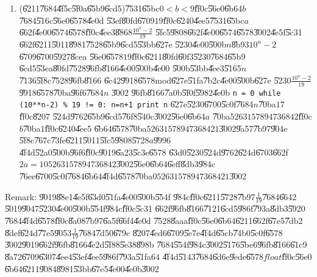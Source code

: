 \documentclass{article}
\begin{document}
\begin{enumerate}
\item (\U{6211}\U{7684}\U{4f5c}\U{5f0a}\U{65b9}\U{6cd5})\U{7531}\U{65bc}$%
0<b<9$\U{ff0c}\U{56e0}\U{6b64}$b$\U{7684}\U{516c}\U{56e0}\U{6578}\U{4e0d}%
\U{53ef}\U{80fd}\U{6709}$19$\U{ff0c}\U{6240}\U{4ee5}\U{7531}\U{65bc}$a$%
\U{662f}\U{4e00}\U{6574}\U{6578}\U{ff0c}\U{4ee3}\U{8868}$\frac{10^{n}-2}{19}$%
\U{5fc5}\U{9808}\U{662f}\U{4e00}\U{6574}\U{6578}\U{3002}\U{4e5f}\U{5c31}%
\U{662f}\U{6211}\U{5011}\U{8981}\U{7528}\U{65b9}\U{6cd5}\U{53bb}\U{627e}%
\U{5230}\U{4e00}\U{500b}$n$\U{8b93}$10^{n}-2$\U{6709}\U{6700}\U{5927}\U{8cea}%
\U{56e0}\U{6578}$19$\U{ff0c}\U{6211}\U{80fd}\U{60f3}\U{5230}\U{7684}\U{65b9}%
\U{6cd5}\U{53ea}\U{80fd}\U{7528}\U{96fb}\U{8166}\U{4e00}\U{500b}\U{4e00}%
\U{500b}\U{53bb}\U{4ee3}\U{5165}$n$\U{7136}\U{5f8c}\U{7528}\U{96fb}\U{8166}%
\U{6c42}\U{9918}\U{6578}mod\U{627e}\U{51fa}\U{7b2c}\U{4e00}\U{500b}\U{627e}%
\U{5230}$\frac{10^{n}-2}{19}$\U{9918}\U{6578}\U{70ba}\U{96f6}\U{7684}$n$%
\U{3002}\newline
\U{96fb}\U{8166}\U{7a0b}\U{5f0f}\U{5982}\U{4e0b}\newline
\texttt{n = 0\newline
while (10**n-2) \% 19 != 0:\newline
\quad n=n+1\newline
print n}\newline
\U{627e}\U{5230}\U{6700}\U{5c0f}\U{7684}$n$\U{70ba}$17$\U{ff0c}\U{8207}%
\U{524d}\U{9762}\U{65b9}\U{6cd5}\U{76f8}\U{540c}\U{3002}\U{56e0}\U{6b64}$a$%
\U{70ba}$5263157894736842$\U{ff0c}$b$\U{70ba}$1$\U{ff0c}\U{6240}\U{4ee5}%
\U{6b64}\U{6578}\U{70ba}$52631578947368421$\U{3002}\U{9a57}\U{7b97}\U{904e}%
\U{5f8c}\U{767c}\U{73fe}\U{6211}\U{5011}\U{5fc5}\U{9808}\U{5728}$a$\U{9996}%
\U{4f4d}\U{52a0}\U{500b}\U{96f6}\U{ff0c}\U{9019}\U{6a23}\U{5c3e}\U{6578}%
\U{63d0}\U{5230}\U{524d}\U{9762}\U{624d}\U{6703}\U{662f}$%
2a=105263157894736842$\U{3002}\U{56e0}\U{6b64}\U{6eff}\U{8db3}\U{984c}%
\U{76ee}\U{6700}\U{5c0f}\U{7684}\U{6b64}\U{4f4d}\U{6578}\U{70ba}$%
052631578947368421$\U{3002}
\end{enumerate}

\bigskip 

Remark: \U{9019}\U{88e1}\U{4e5f}\U{63d0}\U{51fa}\U{4e00}\U{500b}\U{554f}%
\U{984c}\U{ff0c}\U{6211}\U{5728}\U{7b97}$\frac{1}{19}$\U{7684}\U{6642}%
\U{5019}\U{9047}\U{5230}\U{4e00}\U{500b}\U{554f}\U{984c}\U{ff0c}\U{5c31}%
\U{662f}\U{96fb}\U{8166}\U{7121}\U{6cd5}\U{986f}\U{793a}\U{8db3}\U{5920}%
\U{7684}\U{4f4d}\U{6578}\U{ff0c}\U{8a08}\U{7b97}\U{6a5f}\U{66f4}\U{4e0d}%
\U{7528}\U{8aaa}\U{ff0c}\U{56e0}\U{6b64}\U{6211}\U{662f}\U{67e5}\U{7db2}%
\U{8def}\U{624d}\U{77e5}\U{9053}$\frac{1}{19}$\U{7684}\U{7d50}\U{679c}%
\U{8207}\U{4ed6}\U{6709}\U{5e7e}\U{4f4d}\U{65cb}\U{74b0}\U{5c0f}\U{6578}%
\U{3002}\U{9019}\U{662f}\U{96fb}\U{8166}\U{4e2d}\U{5f88}\U{5e38}\U{898b}%
\U{7684}\U{554f}\U{984c}\U{3002}\U{5176}\U{5be6}\U{96fb}\U{8166}\U{61c9}%
\U{8a72}\U{6709}\U{6307}\U{4ee4}\U{53ef}\U{4ee5}\U{986f}\U{793a}\U{51fa}$64$%
\U{4f4d}\U{5143}\U{7684}\U{6d6e}\U{9ede}\U{6578}$float$\U{ff0c}\U{56e0}%
\U{6b64}\U{6211}\U{9084}\U{8981}\U{53bb}\U{67e5}\U{4e00}\U{4e0b}\U{3002}
\end{document}
